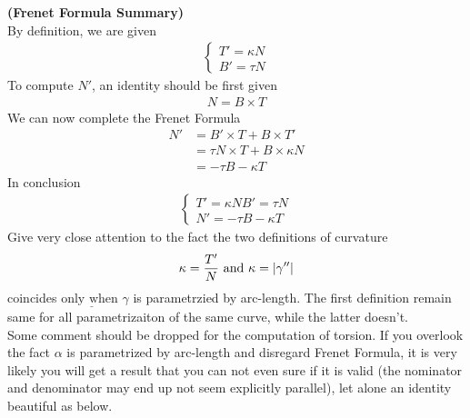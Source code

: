 \documentclass{report}
\begin{document}
\begin{mdframed}
\textbf{(Frenet Formula Summary)} \\

By definition, we are given 
\begin{align*}
\begin{cases}
  T'=\kappa N\\
  B'=\tau N
\end{cases}
\end{align*}
To compute $N'$, an identity should be first given 
 \begin{align*}
N=B\times T
\end{align*}
We can now complete the Frenet Formula 
\begin{align*}
N'&=B'\times T + B \times T'\\
&=\tau N \times T + B \times \kappa N\\
&=-\tau B-\kappa T
\end{align*}
In conclusion 
\begin{align*}
\begin{cases}
  T'=\kappa N
  B' =\tau N\\
  N'=-\tau B-\kappa T
\end{cases}
\end{align*}
Give very close attention to the fact the two definitions of curvature 
\begin{align*}
\kappa =\frac{T'}{N}\text{ and }\kappa = \left|\gamma ''\right|
\end{align*}
coincides $\underline{\text{only when }}\gamma $ is parametrzied by arc-length. The first definition remain same for all parametrizaiton of the same curve, while the latter doesn't.\\

Some comment should be dropped for the computation of torsion. If you overlook the fact $\alpha $ is parametrized by arc-length and disregard Frenet Formula, it is very likely you will get a result that you can not even sure if it is valid (the nominator and denominator may end up not seem explicitly parallel), let alone an identity beautiful as below. 
\end{mdframed}
\end{document}
